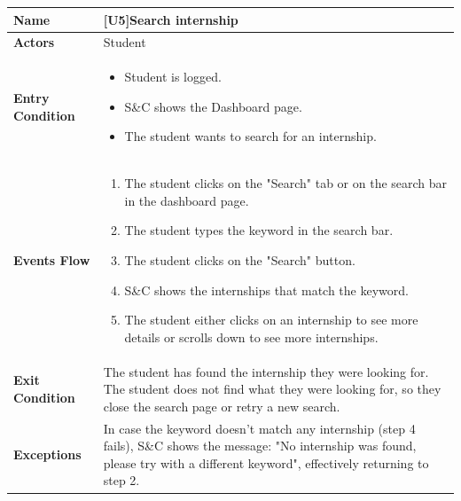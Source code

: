\begin{center}
    \begin{tabular}{|p{9em}|p{27em}|}
        \hline
        \rowcolor{bluepoli!40} %
        \textbf{Name} & \textbf{[U5]Search internship} \\
        \hline
        \textbf{Actors} & Student \\
        \hline
        \textbf{Entry Condition} &  
        \begin{itemize}
            \item Student is logged.
            \item S\&C shows the Dashboard page.
            \item The student wants to search for an internship.
        \end{itemize} \\
        \hline
        \textbf{Events Flow} & 
        \begin{enumerate}
            \item The student clicks on the "Search" tab or on the search bar in the dashboard page.
            \item The student types the keyword in the search bar.
            \item The student clicks on the "Search" button.
            \item S\&C shows the internships that match the keyword.
            \item The student either clicks on an internship to see more details or scrolls down to see more internships.
        \end{enumerate} \\
        \hline
        \textbf{Exit Condition} & The student has found the internship they were looking for. The student does not find what they were looking for,
        so they close the search page or retry a new search. \\
        \hline
        \textbf{Exceptions} & In case the keyword doesn't match any internship (step 4 fails), S\&C shows the message: "No internship was found,
        please try with a different keyword", effectively returning to step 2. \\
        \hline
    \end{tabular}
\end{center}

